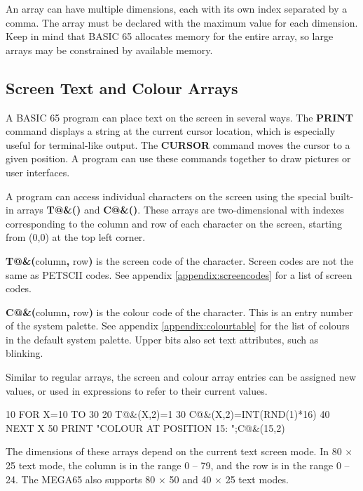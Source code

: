 An array can have multiple dimensions, each with its own index separated by a
comma. The array must be declared with the maximum value for each dimension.
Keep in mind that BASIC 65 allocates memory for the entire array, so large
arrays may be constrained by available memory.


\subsection{Screen Text and Colour Arrays}
\label{sec:screentextandcolourarrays}

A BASIC 65 program can place text on the screen in several ways. The {\bf
PRINT} command displays a string at the current cursor location, which is
especially useful for terminal-like output. The {\bf CURSOR} command moves the
cursor to a given position. A program can use these commands together to draw
pictures or user interfaces.

A program can access individual characters on the screen using the special
built-in arrays \textbf{T@\&()} and \textbf{C@\&()}. These arrays are
two-dimensional with indexes corresponding to the column and row of each
character on the screen, starting from (0,0) at the top left corner.

\textbf{T@\&(}column{\bf ,} row{\bf )} is the screen code of the character.
Screen codes are not the same as PETSCII codes. See appendix
\vref{appendix:screencodes} for a list of screen codes.

\textbf{C@\&(}column{\bf ,} row{\bf )} is the colour code of the character.
This is an entry number of the system palette. See appendix
\vref{appendix:colourtable} for the list of colours in the default system
palette. Upper bits also set text attributes, such as blinking.

Similar to regular arrays, the screen and colour array entries can be assigned new
values, or used in expressions to refer to their current values.

\begin{screencode}
10 FOR X=10 TO 30
20 T@&(X,2)=1
30 C@&(X,2)=INT(RND(1)*16)
40 NEXT X
50 PRINT "COLOUR AT POSITION 15: ";C@&(15,2)
\end{screencode}

The dimensions of these arrays depend on the current text screen mode. In 80
$\times$ 25 text mode, the column is in the range 0 -- 79, and the row is in
the range 0 -- 24. The MEGA65 also supports 80 $\times$ 50 and 40 $\times$ 25
text modes.

